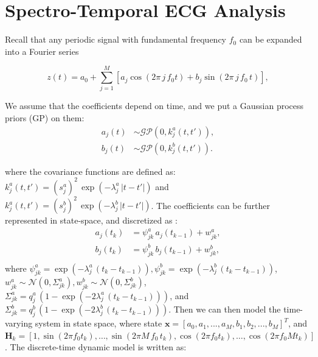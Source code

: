 \documentclass[portrait,a0,final]{a0poster} %
\newcommand{\sectionspace}{10mm} %
\begin{document}
\begin{minipage}{0.98\linewidth}
\begin{minipage}[t]{0.47\linewidth}
\vspace{\sectionspace}
\section*{Spectro-Temporal ECG Analysis}

Recall that any periodic signal with fundamental frequency $f_0$ can be expanded into a Fourier series

\begin{equation}
z(t) = a_0 + \sum_{j=1}^{M} \left[ a_{j} \cos(2\pi \, j \, f_0 t) + b_{j} \sin(2\pi  \, j \, f_0 \, t) \right],
\label{equ:fourier_series}
\end{equation}

We assume that the coefficients depend on time, and we put a Gaussian process priors (GP) on them:
%
\begin{equation}
\begin{split}
a_j(t) &\sim \mathcal{GP}(0,k^a_j(t,t')), \\
b_j(t) &\sim \mathcal{GP}(0,k^b_j(t,t')).
\end{split}
\end{equation}

where the covariance functions are defined as: $k^a_j(t,t') = (s^a_j)^2 \, \exp( -\lambda^a_j \, | t - t' | )$ and $k^a_j(t,t') = (s^b_j)^2 \, \exp( -\lambda^b_j \, | t - t' | )$. The coefficients can be further represented in state-space, and discretized as \cite{Sarkka:2006}: 
%
%
\begin{equation}
\begin{split}
a_j(t_k) &= \psi^a_{jk} \, a_j(t_{k-1}) + w^a_{jk}, \\
b_j(t_k) &= \psi^b_{jk} \, b_j(t_{k-1}) + w^b_{jk}, \\
\end{split}
\label{eq:discdyn}
\end{equation}
%
where $\psi^a_{jk} = \exp(-\lambda^a_j \, (t_k - t_{k-1})), \psi^b_{jk} = \exp(-\lambda^b_j \, (t_k - t_{k-1}))$, $w^a_{jk} \sim \mathcal{N}(0,\Sigma^a_{jk}), w^b_{jk} \sim \mathcal{N}(0,\Sigma^b_{jk})$, $\Sigma^a_{jk} = q^a_j \, (1 - \exp(-2 \lambda^a_j \, (t_k - t_{k-1})))$, and $\Sigma^b_{jk} = q^b_j \, (1 - \exp(-2 \lambda^b_j \, (t_k - t_{k-1})))$. Then we can then model the time-varying system in state space, where state $\mathbf{x} = [a_{0}, a_{1}, ..., a_{M}, b_{1}, b_{2}, ..., b_{M}]^T$, and $\mathbf{H}_k = [1, \sin(2\pi f_0 t_k), \ldots, \sin(2\pi M \, f_0 \, t_k), \cos(2\pi f_0 t_k), \ldots, \cos(2\pi f_0M t_k)]$. The discrete-time dynamic model is written as:


\end{minipage}
\end{minipage}
\end{document}
